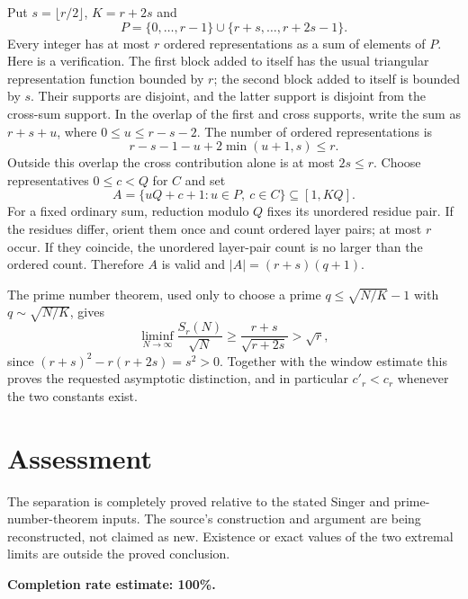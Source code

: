 \documentclass[11pt]{article}
\begin{document}
Put $s=\lfloor r/2\rfloor$, $K=r+2s$ and
\[
 P=\{0,\ldots,r-1\}\cup\{r+s,\ldots,r+2s-1\}.
\]
Every integer has at most $r$ ordered representations as a sum of elements of $P$. Here is a verification. The first block added to itself has the usual triangular representation function bounded by $r$; the second block added to itself is bounded by $s$. Their supports are disjoint, and the latter support is disjoint from the cross-sum support. In the overlap of the first and cross supports, write the sum as $r+s+u$, where $0\le u\le r-s-2$. The number of ordered representations is
\[
 r-s-1-u+2\min(u+1,s)\le r.
\]
Outside this overlap the cross contribution alone is at most $2s\le r$.
Choose representatives $0\le c<Q$ for $C$ and set
\[
 A=\{uQ+c+1:u\in P,\ c\in C\}\subseteq[1,KQ].
\]
For a fixed ordinary sum, reduction modulo $Q$ fixes its unordered residue pair. If the residues differ, orient them once and count ordered layer pairs; at most $r$ occur. If they coincide, the unordered layer-pair count is no larger than the ordered count. Therefore $A$ is valid and $|A|=(r+s)(q+1)$.

The prime number theorem, used only to choose a prime $q\le\sqrt{N/K}-1$ with $q\sim\sqrt{N/K}$, gives
\[
 \liminf_{N\to\infty}\frac{S_r(N)}{\sqrt N}\ge\frac{r+s}{\sqrt{r+2s}}>\sqrt r,
\]
since $(r+s)^2-r(r+2s)=s^2>0$. Together with the window estimate this proves the requested asymptotic distinction, and in particular $c'_r<c_r$ whenever the two constants exist.

\section*{Assessment}
The separation is completely proved relative to the stated Singer and prime-number-theorem inputs. The source's construction and argument are being reconstructed, not claimed as new. Existence or exact values of the two extremal limits are outside the proved conclusion.

\textbf{Completion rate estimate: 100\%.}
\end{document}
